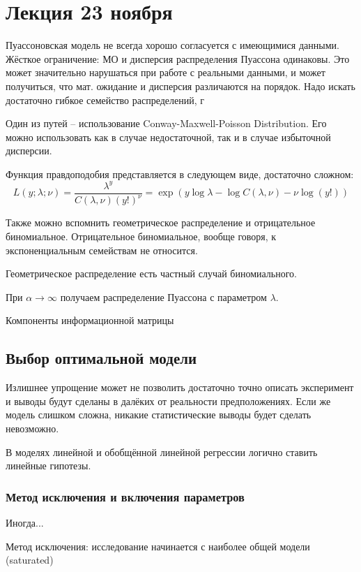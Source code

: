 \documentclass[main.tex]{subfiles}
\begin{document}
\section{ Лекция 23 ноября }

Пуассоновская модель не всегда хорошо согласуется с имеющимися данными.
Жёсткое ограничение: МО и дисперсия распределения Пуассона одинаковы.
Это может значительно нарушаться при работе с реальными данными, и может получиться, что мат. ожидание и дисперсия различаются на порядок.
Надо искать достаточно гибкое семейство распределений, г

Один из путей -- использование Conway-Maxwell-Poisson Distribution.
Его можно использовать как в случае недостаточной, так и в случае избыточной дисперсии.

Функция правдоподобия представляется в следующем виде, достаточно сложном:
\[ L(y; \lambda; \nu) = \frac{\lambda^y}{C(\lambda,\nu)(y!)^\nu} = \exp(y \log \lambda - \log C (\lambda, \nu) - \nu \log (y!)) \]

Также можно вспомнить геометрическое распределение и отрицательное биномиальное.
Отрицательное биномиальное, вообще говоря, к экспоненциальным семействам не относится.

Геометрическое распределение есть частный случай биномиального.

При $ \alpha \to \infty $ получаем распределение Пуассона с параметром $ \lambda $.

Компоненты информационной матрицы %

\subsection{Выбор оптимальной модели}

Излишнее упрощение может не позволить достаточно точно описать эксперимент и выводы будут сделаны в далёких от реальности предположениях.
Если же модель слишком сложна, никакие статистические выводы будет сделать невозможно.

В моделях линейной и обобщённой линейной регрессии логично ставить линейные гипотезы.

\subsubsection{Метод исключения и включения параметров}

Иногда... %

Метод исключения: исследование начинается с наиболее общей модели (saturated) \\
\end{document}
